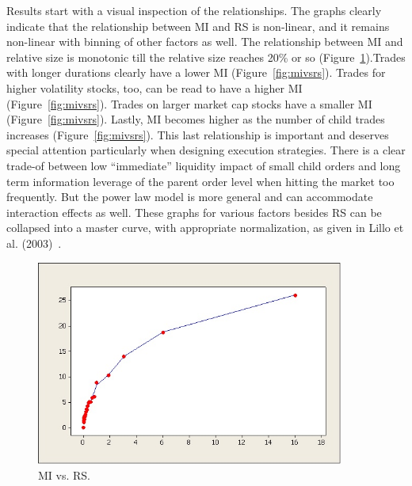 Results start with a visual inspection of the relationships. The graphs clearly indicate that the relationship between MI and RS is non-linear, and it remains non-linear with binning of other factors as well. The relationship between MI and relative size is monotonic till the relative size reaches 20\% or so (Figure~\ref{fig:miandrsplot}).Trades with longer durations clearly have a lower MI (Figure~\ref{fig:mivsrs}). Trades for higher volatility stocks, too, can be read to have a higher MI (Figure~\ref{fig:mivsrs}). Trades on larger market cap stocks have a smaller MI (Figure~\ref{fig:mivsrs}). Lastly, MI becomes higher as the number of child trades increases (Figure~\ref{fig:mivsrs}). This last relationship is important and deserves special attention particularly when designing execution strategies. There is a clear trade-of between low ``immediate'' liquidity impact of small child orders and long term information leverage of the parent order level when hitting the market too frequently. But the power law model is more general and can accommodate interaction effects as well. These graphs for various factors besides RS can be collapsed into a master curve, with appropriate normalization, as given in Lillo et al. (2003)~\cite{farmermantegna}.
	

	\begin{figure}[!ht]
	\centering
	\includegraphics[width=0.9\textwidth]{chapters/chapter_exec_models/figures/fig3.jpg}
	\caption{MI vs. RS. \label{fig:miandrsplot}}
	\end{figure}


